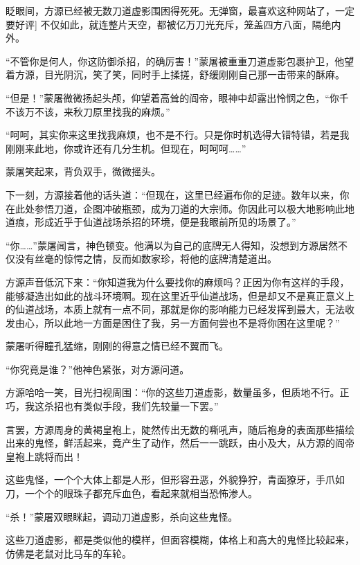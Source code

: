 
\begin{this_body}

眨眼间，方源已经被无数刀道虚影围困得死死。无弹窗，最喜欢这种网站了，一定要好评] 不仅如此，就连整片天空，都被亿万刀光充斥，笼盖四方八面，隔绝内外。

“不管你是何人，你这防御杀招，的确厉害！”蒙屠被重重刀道虚影包裹护卫，他望着方源，目光阴沉，笑了笑，同时手上揉搓，舒缓刚刚自己那一击带来的酥麻。

“但是！”蒙屠微微扬起头颅，仰望着高耸的阎帝，眼神中却露出怜悯之色，“你千不该万不该，来秋刀原里找我的麻烦。”

“呵呵，其实你来这里找我麻烦，也不是不行。只是你时机选得大错特错，若是我刚刚来此地，你或许还有几分生机。但现在，呵呵呵……”

蒙屠笑起来，背负双手，微微摇头。

下一刻，方源接着他的话头道：“但现在，这里已经遍布你的足迹。数年以来，你在此处参悟刀道，企图冲破瓶颈，成为刀道的大宗师。你因此可以极大地影响此地道痕，形成近乎于仙道战场杀招的环境，便是我眼前所见的场景了。”

“你……”蒙屠闻言，神色顿变。他满以为自己的底牌无人得知，没想到方源居然不仅没有丝毫的惊愕之情，反而如数家珍，将他的底牌清楚道出。

方源声音低沉下来：“你知道我为什么要找你的麻烦吗？正因为你有这样的手段，能够凝造出如此的战斗环境啊。现在这里近乎仙道战场，但是却又不是真正意义上的仙道战场，本质上就有一点不同，那就是你的影响能力已经发挥到最大，无法收发由心，所以此地一方面是困住了我，另一方面何尝也不是将你困在这里呢？”

蒙屠听得瞳孔猛缩，刚刚的得意之情已经不翼而飞。

“你究竟是谁？”他神色紧张，对方源问道。

方源哈哈一笑，目光扫视周围：“你的这些刀道虚影，数量虽多，但质地不行。正巧，我这杀招也有类似手段，我们先较量一下罢。”

言罢，方源周身的黄褐皇袍上，陡然传出无数的嘶吼声，随后袍身的表面那些描绘出来的鬼怪，鲜活起来，竟产生了动作，然后一一跳跃，由小及大，从方源的阎帝皇袍上跳将而出！

这些鬼怪，一个个大体上都是人形，但形容丑恶，外貌狰狞，青面獠牙，手爪如刀，一个个的眼珠子都充斥血色，看起来就相当恐怖渗人。

“杀！”蒙屠双眼眯起，调动刀道虚影，杀向这些鬼怪。

这些刀道虚影，都是类似他的模样，但面容模糊，体格上和高大的鬼怪比较起来，仿佛是老鼠对比马车的车轮。


\end{this_body}
